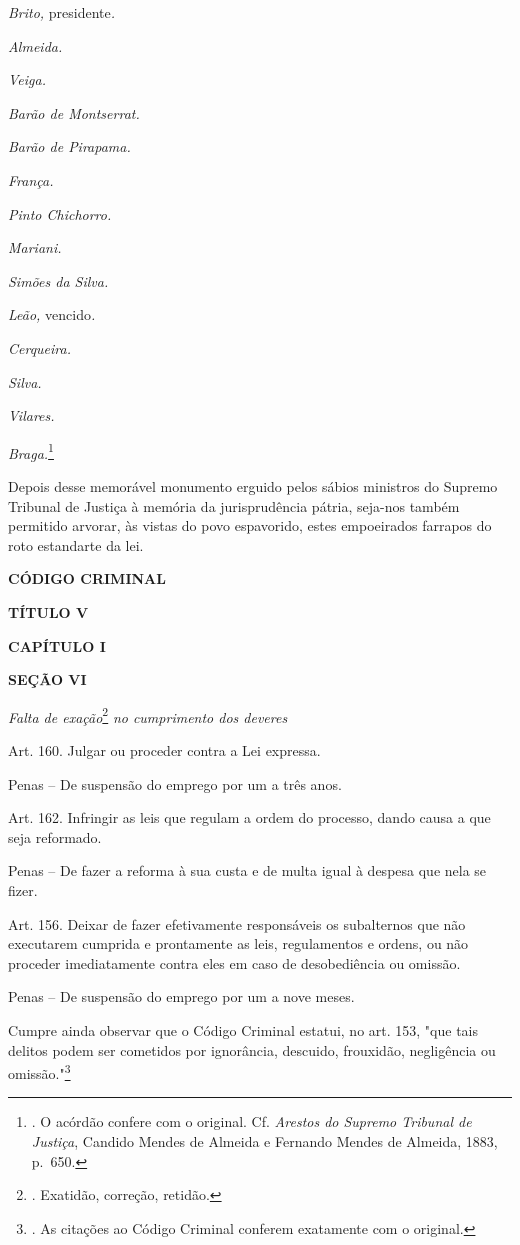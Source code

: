 \emph{Brito,} presidente\emph{.}

\emph{Almeida.}

\emph{Veiga.}

\emph{Barão de Montserrat.}

\emph{Barão de Pirapama.}

\emph{França.}

\emph{Pinto Chichorro.}

\emph{Mariani.}

\emph{Simões da Silva.}

\emph{Leão,} vencido\emph{.}

\emph{Cerqueira.}

\emph{Silva.}

\emph{Vilares.}

\emph{Braga.}\footnote{. O acórdão confere com o original. Cf.
  \emph{Arestos do Supremo Tribunal de Justiça}, Candido Mendes de
  Almeida e Fernando Mendes de Almeida, 1883, p.~650.}

Depois desse memorável monumento erguido pelos sábios ministros do
Supremo Tribunal de Justiça à memória da jurisprudência pátria, seja-nos
também permitido arvorar, às vistas do povo espavorido, estes
empoeirados farrapos do roto estandarte da lei.

\textbf{CÓDIGO CRIMINAL}

\textbf{TÍTULO V}

\textbf{CAPÍTULO I}

\textbf{SEÇÃO VI}

\emph{Falta de exação}\footnote{. Exatidão, correção, retidão.} \emph{no
cumprimento dos deveres}

Art. 160. Julgar ou proceder contra a Lei expressa.

Penas -- De suspensão do emprego por um a três anos.

Art. 162. Infringir as leis que regulam a ordem do processo, dando causa
a que seja reformado.

Penas -- De fazer a reforma à sua custa e de multa igual à despesa que
nela se fizer.

Art. 156. Deixar de fazer efetivamente responsáveis os subalternos que
não executarem cumprida e prontamente as leis, regulamentos e ordens, ou
não proceder imediatamente contra eles em caso de desobediência ou
omissão.

Penas -- De suspensão do emprego por um a nove meses.

Cumpre ainda observar que o Código Criminal estatui, no art. 153, "que
tais delitos podem ser cometidos por ignorância, descuido, frouxidão,
negligência ou omissão."\footnote{. As citações ao Código Criminal
  conferem exatamente com o original.}

